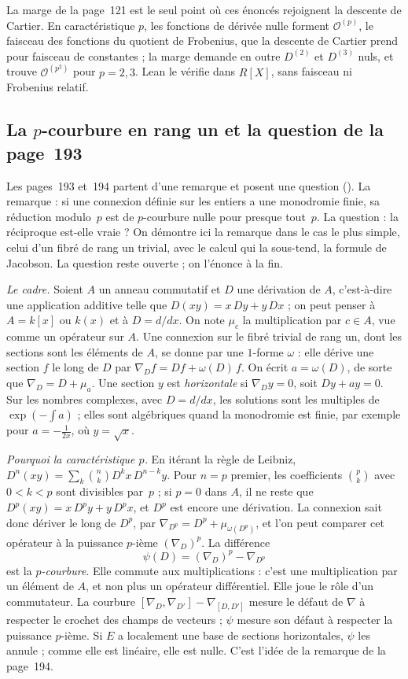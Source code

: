 La marge de la page~121 est le seul point où ces énoncés rejoignent la descente de Cartier. En caractéristique $p$, les fonctions de dérivée nulle forment $\mathcal O^{(p)}$, le faisceau des fonctions du quotient de Frobenius, que la descente de Cartier prend pour faisceau de constantes ; la marge demande en outre $D^{(2)}$ et $D^{(3)}$ nuls, et trouve $\mathcal O^{(p^2)}$ pour $p = 2, 3$. Lean le vérifie dans $R[X]$, sans faisceau ni Frobenius relatif.

\subsection*{La $p$-courbure en rang un et la question de la page~193}

Les pages~193 et~194 partent d'une remarque et posent une question (). La remarque : si une connexion définie sur les entiers a une monodromie finie, sa réduction modulo~$p$ est de $p$-courbure nulle pour presque tout~$p$. La question : la réciproque est-elle vraie ? On démontre ici la remarque dans le cas le plus simple, celui d'un fibré de rang un trivial, avec le calcul qui la sous-tend, la formule de Jacobson. La question reste ouverte ; on l'énonce à la fin.

\noindent\emph{Le cadre.} Soient $A$ un anneau commutatif et $D$ une dérivation de $A$, c'est-à-dire une application additive telle que $D(xy) = x\,Dy + y\,Dx$ ; on peut penser à $A = k[x]$ ou $k(x)$ et à $D = d/dx$. On note $\mu_c$ la multiplication par $c \in A$, vue comme un opérateur sur $A$. Une connexion sur le fibré trivial de rang un, dont les sections sont les éléments de $A$, se donne par une $1$-forme $\omega$ : elle dérive une section $f$ le long de $D$ par $\nabla_D f = Df + \omega(D)\,f$. On écrit $a = \omega(D)$, de sorte que $\nabla_D = D + \mu_a$. Une section $y$ est \emph{horizontale} si $\nabla_D y = 0$, soit $Dy + ay = 0$. Sur les nombres complexes, avec $D = d/dx$, les solutions sont les multiples de $\exp(-\int a)$ ; elles sont algébriques quand la monodromie est finie, par exemple pour $a = -\frac{1}{2x}$, où $y = \sqrt x$.

\noindent\emph{Pourquoi la caractéristique $p$.} En itérant la règle de Leibniz, $D^n(xy) = \sum_k \binom nk D^k x\,D^{n-k} y$. Pour $n = p$ premier, les coefficients $\binom pk$ avec $0 < k < p$ sont divisibles par~$p$ ; si $p = 0$ dans $A$, il ne reste que $D^p(xy) = x\,D^p y + y\,D^p x$, et $D^p$ est encore une dérivation. La connexion sait donc dériver le long de $D^p$, par $\nabla_{D^p} = D^p + \mu_{\omega(D^p)}$, et l'on peut comparer cet opérateur à la puissance $p$-ième $(\nabla_D)^p$. La différence
\[
\psi(D) = (\nabla_D)^p - \nabla_{D^p}
\]
est la \emph{$p$-courbure}. Elle commute aux multiplications : c'est une multiplication par un élément de $A$, et non plus un opérateur différentiel. Elle joue le rôle d'un commutateur. La courbure $[\nabla_D, \nabla_{D'}] - \nabla_{[D, D']}$ mesure le défaut de $\nabla$ à respecter le crochet des champs de vecteurs ; $\psi$ mesure son défaut à respecter la puissance $p$-ième. Si $E$ a localement une base de sections horizontales, $\psi$ les annule ; comme elle est linéaire, elle est nulle. C'est l'idée de la remarque de la page~194.

